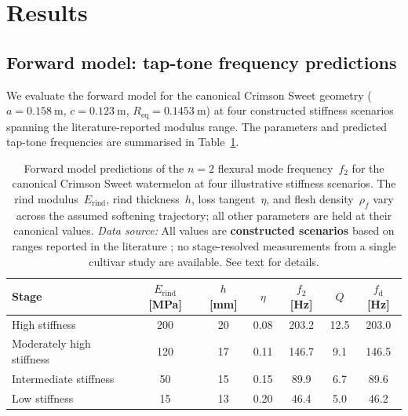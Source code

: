\section{Results}
\label{sec:results}

\subsection{Forward model: tap-tone frequency predictions}
\label{sec:forward}

We evaluate the forward model for the canonical Crimson Sweet geometry
($a = \SI{0.158}{\metre}$, $c = \SI{0.123}{\metre}$,
$R_{\mathrm{eq}} = \SI{0.1453}{\metre}$) at four constructed stiffness
scenarios spanning the literature-reported modulus range.  The parameters and predicted
tap-tone frequencies are summarised in Table~\ref{tab:forward_results}.

\begin{table}[t]
  \centering
  \caption{Forward model predictions of the $n = 2$ flexural mode
    frequency~$f_2$ for the canonical Crimson Sweet watermelon at four
    illustrative stiffness scenarios.  The rind modulus~$E_{\mathrm{rind}}$, rind
    thickness~$h$, loss tangent~$\eta$, and flesh density~$\rho_f$ vary
    across the assumed softening trajectory; all other parameters are held at their canonical values.
    \emph{Data source:} All values are \textbf{constructed scenarios}
    based on ranges reported in the literature
    \cite{Sadrnia2008, DeBelieetal2000}; no stage-resolved
    measurements from a single cultivar study are available.
    See text for details.}
  \label{tab:forward_results}
  \begin{tabular}{lcccccc}
    \toprule
    Stage & $E_{\mathrm{rind}}$ [MPa] & $h$ [mm] & $\eta$ &
      $f_2$ [Hz] & $Q$ & $f_{\mathrm{d}}$ [Hz] \\
    \midrule
    High stiffness              & 200 & 20 & 0.08 & 203.2 & 12.5 & 203.0 \\
    Moderately high stiffness   & 120 & 17 & 0.11 & 146.7 &  9.1 & 146.5 \\
    Intermediate stiffness      &  50 & 15 & 0.15 &  89.9 &  6.7 &  89.6 \\
    Low stiffness               &  15 & 13 & 0.20 &  46.4 &  5.0 &  46.2 \\
    \bottomrule
  \end{tabular}
\end{table}

